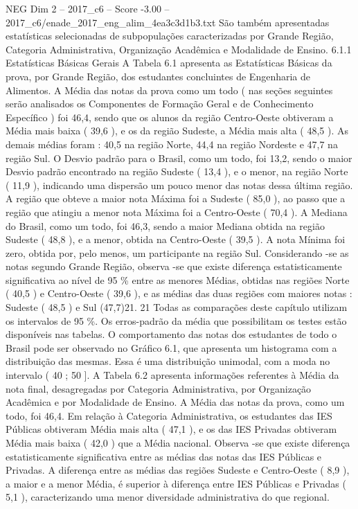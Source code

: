 \begin{textsample}{NEG Dim 2 – 2017\_c6 – Score -3.00 – 2017\_c6/enade\_2017\_eng\_alim\_4ea3c3d1b3.txt}
São também apresentadas estatísticas selecionadas de subpopulações caracterizadas por Grande Região, Categoria Administrativa, Organização Acadêmica e Modalidade de Ensino. 6.1.1 Estatísticas Básicas Gerais A Tabela 6.1 apresenta as Estatísticas Básicas da prova, por Grande Região, dos estudantes concluintes de Engenharia de Alimentos.
A Média das notas da prova como um todo ( nas seções seguintes serão analisados os Componentes de Formação Geral e de Conhecimento Específico ) foi 46,4, sendo que os alunos da região Centro-Oeste obtiveram a Média mais baixa ( 39,6 ), e os da região Sudeste, a Média mais alta ( 48,5 ).
As demais médias foram : 40,5 na região Norte, 44,4 na região Nordeste e 47,7 na região Sul.
O Desvio padrão para o Brasil, como um todo, foi 13,2, sendo o maior Desvio padrão encontrado na região Sudeste ( 13,4 ), e o menor, na região Norte ( 11,9 ), indicando uma dispersão um pouco menor das notas dessa última região.
A região que obteve a maior nota Máxima foi a Sudeste ( 85,0 ), ao passo que a região que atingiu a menor nota Máxima foi a Centro-Oeste ( 70,4 ).
A Mediana do Brasil, como um todo, foi 46,3, sendo a maior Mediana obtida na região Sudeste ( 48,8 ), e a menor, obtida na Centro-Oeste ( 39,5 ).
A nota Mínima foi zero, obtida por, pelo menos, um participante na região Sul.
Considerando -se as notas segundo Grande Região, observa -se que existe diferença estatisticamente significativa ao nível de 95 \% entre as menores Médias, obtidas nas regiões Norte ( 40,5 ) e Centro-Oeste ( 39,6 ), e as médias das duas regiões com maiores notas : Sudeste ( 48,5 ) e Sul (47,7)21. 21 Todas as comparações deste capítulo utilizam os intervalos de 95 \%.
Os erros-padrão da média que possibilitam os testes estão disponíveis nas tabelas.
O comportamento das notas dos estudantes de todo o Brasil pode ser observado no Gráfico 6.1, que apresenta um histograma com a distribuição das mesmas.
Essa é uma distribuição unimodal, com a moda no intervalo ( 40 ; 50 ].
A Tabela 6.2 apresenta informações referentes à Média da nota final, desagregadas por Categoria Administrativa, por Organização Acadêmica e por Modalidade de Ensino.
A Média das notas da prova, como um todo, foi 46,4.
Em relação à Categoria Administrativa, os estudantes das IES Públicas obtiveram Média mais alta ( 47,1 ), e os das IES Privadas obtiveram Média mais baixa ( 42,0 ) que a Média nacional.
Observa -se que existe diferença estatisticamente significativa entre as médias das notas das IES Públicas e Privadas.
A diferença entre as médias das regiões Sudeste e Centro-Oeste ( 8,9 ), a maior e a menor Média, é superior à diferença entre IES Públicas e Privadas ( 5,1 ), caracterizando uma menor diversidade administrativa do que regional.

\end{textsample}
